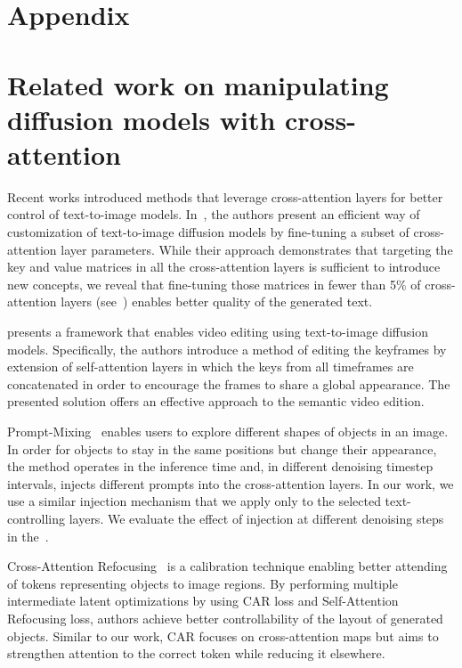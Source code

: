 \section*{\LARGE Appendix}\label{appendix}

\section{Related work on manipulating diffusion models with cross-attention} \label{app:related_cross}
Recent works introduced methods that leverage cross-attention layers for better control of text-to-image models. In~\cite{kumari2022multiconcept}, the authors present an efficient way of customization of text-to-image diffusion models by fine-tuning a subset of cross-attention layer parameters. While their approach demonstrates that targeting the key and value matrices in all the cross-attention layers is sufficient to introduce new concepts, we reveal that fine-tuning those matrices in fewer than 5\% of cross-attention layers (see~) enables better quality of the generated text.

\cite{DBLP:conf/iclr/GeyerBBD24} presents a framework that enables video editing using text-to-image diffusion models. Specifically, the authors introduce a method of editing the keyframes by extension of self-attention layers in which the keys from all timeframes are concatenated in order to encourage the frames to share a global appearance. The presented solution offers an effective approach to the semantic video edition.

Prompt-Mixing~\citep{Patashnik_2023_ICCV} enables users to explore different shapes of objects in an image. In order for objects to stay in the same positions but change their appearance, the method operates in the inference time and, in different denoising timestep intervals, injects different prompts into the cross-attention layers. In our work, we use a similar injection mechanism that we apply only to the selected text-controlling layers. We evaluate the effect of injection at different denoising steps in the~.

Cross-Attention Refocusing~\citep{phung2023grounded} is a calibration technique enabling better attending of tokens representing objects to image regions. By performing multiple intermediate latent optimizations by using CAR loss and Self-Attention Refocusing loss, authors achieve better controllability of the layout of generated objects. Similar to our work, CAR focuses on cross-attention maps but aims to strengthen attention to the correct token while reducing it elsewhere.

